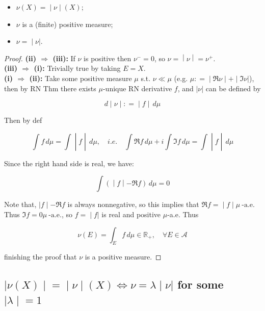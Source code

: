\documentclass{qlnotes-export}
\begin{document}
\begin{itemize}
\item
  \(\left. \nu(X) = \middle| \nu \middle| (X) \right.\);
\item
  \(\nu\) is a (finite) positive measure;
\item
  \(\left. \nu = \middle| \nu| \right.\).
\end{itemize}

\begin{proof}

\textbf{(ii) \(\Longrightarrow\) (iii):} If \(\nu\) is positive then \(\nu^{-} = 0\), so \(\left. \nu = \middle| \nu \middle| = \nu^{+} \right.\).\\
\textbf{(iii) \(\Longrightarrow\) (i):} Trivially true by taking \(E = X\).\\
\textbf{(i) \(\Longrightarrow\) (ii):} Take some positive measure \(\mu\) s.t. \(\nu \ll \mu\) (e.g. \(\left. \mu: = \middle| \Re\nu \middle| + \middle| \Im\nu| \right.\)), then by RN Thm there exists \(\mu\)-unique RN derivative \(f\), and \(|\nu|\) can be defined by

\[\left. d \middle| \nu \middle| : = \middle| f \middle| \, d\mu \right.\]

Then by def

\[\left. \int f\, d\mu = \int \middle| f \middle| \, d\mu,\quad i.e.\quad\int\Re f\, d\mu + i\int\Im f\, d\mu = \int \middle| f \middle| \, d\mu \right.\]

Since the right hand side is real, we have:

\[\left. \int( \middle| f \middle| - \Re f)\, d\mu = 0 \right.\]

Note that, \(\left. |f \middle| - \Re f \right.\) is always nonnegative, so this implies that \(\left. \Re f = \middle| f \middle| \mu\ \text{-a.e.} \right.\)\\
Thus \(\Im f = 0\mu\ \text{-a.e.}\), so \(\left. f = \middle| f| \right.\) is real and positive \(\mu\)-a.e. Thus

\[\nu(E) = \int_{E}f\, d\mu \in {\mathbb{R}}_{+},\quad\forall E \in \mathcal{A}\]

finishing the proof that \(\nu\) is a positive measure.

\end{proof}

\subsection{\texorpdfstring{\(\left. |\nu(X) \middle| = \middle| \nu \middle| (X)\Leftrightarrow\nu = \lambda \middle| \nu| \right.\) for some \(\left. |\lambda \middle| = 1 \right.\)}{\textbackslash left. \textbar\textbackslash nu(X) \textbackslash middle\textbar{} = \textbackslash middle\textbar{} \textbackslash nu \textbackslash middle\textbar{} (X)\textbackslash Leftrightarrow\textbackslash nu = \textbackslash lambda \textbackslash middle\textbar{} \textbackslash nu\textbar{} \textbackslash right. for some \textbackslash left. \textbar\textbackslash lambda \textbackslash middle\textbar{} = 1 \textbackslash right.}}\label{left.-nux-middle-middle-nu-middle-xleftrightarrownu-lambda-middle-nu-right.-for-some-left.-lambda-middle-1-right.}
\end{document}
